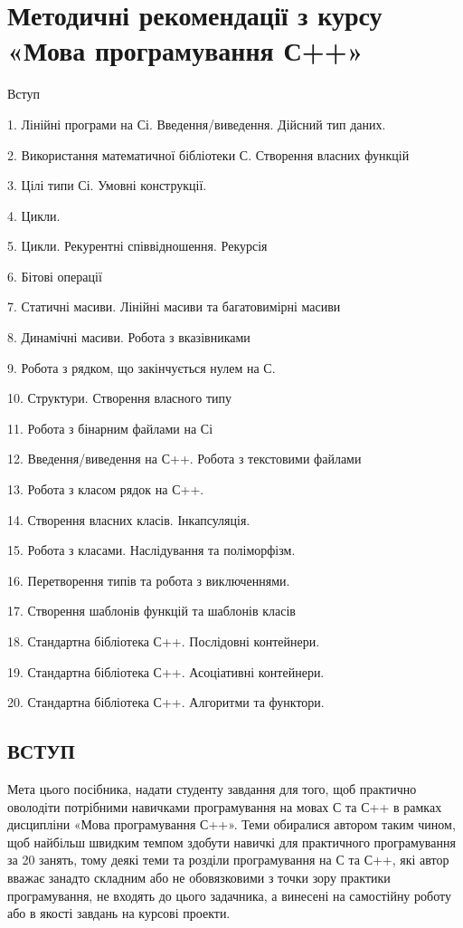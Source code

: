\documentclass[]{article}
\date{}
\begin{document}
\section*{ Методичні рекомендації з курсу «Мова програмування С++» }

Вступ

1. Лінійні програми на Сі. Введення/виведення. Дійсний тип даних.

2. Використання математичної бібліотеки С. Створення власних функцій

3. Цілі типи Сі. Умовні конструкції.

4. Цикли.

5. Цикли. Рекурентні співвідношення. Рекурсія

6. Бітові операції

7. Статичні масиви. Лінійні масиви та багатовимірні масиви

8. Динамічні масиви. Робота з вказівниками

9. Робота з рядком, що закінчується нулем на С.

10. Структури. Створення власного типу

11. Робота з бінарним файлами на Сі

12. Введення/виведення на С++. Робота з текстовими файлами

13. Робота з класом рядок на С++.

14. Створення власних класів. Інкапсуляція.

15. Робота з класами. Наслідування та поліморфізм.

16. Перетворення типів та робота з виключеннями.

17. Створення шаблонів функцій та шаблонів класів

18. Стандартна бібліотека С++. Послідовні контейнери.

19. Стандартна бібліотека С++. Асоціативні контейнери.

20. Стандартна бібліотека С++. Алгоритми та функтори.

\subsection{ ВСТУП }

Мета цього посібника, надати студенту завдання для того, щоб практично
оволодіти потрібними навичками програмування на мовах С та С++ в рамках
дисципліни «Мова програмування С++». Теми обиралися автором таким чином,
щоб найбільш швидким темпом здобути навичкі для практичного
програмування за 20 занять, тому деякі теми та розділи програмування на
С та С++, які автор вважає занадто складним або не обовязковими з точки
зору практики програмування, не входять до цього задачника, а винесені
на самостійну роботу або в якості завдань на курсові проекти.
\end{document}
